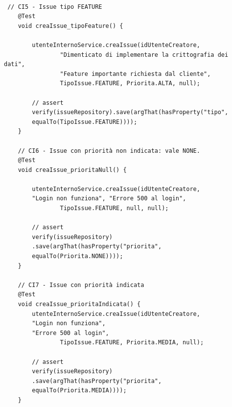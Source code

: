 \begin{listing}[!ht]
\begin{verbatim}

 // CI5 - Issue tipo FEATURE
    @Test
    void creaIssue_tipoFeature() {

        utenteInternoService.creaIssue(idUtenteCreatore, 
                "Dimenticato di implementare la crittografia dei dati",
                "Feature importante richiesta dal cliente",
                TipoIssue.FEATURE, Priorita.ALTA, null);

        // assert
        verify(issueRepository).save(argThat(hasProperty("tipo", 
        equalTo(TipoIssue.FEATURE))));
    }

    // CI6 - Issue con priorità non indicata: vale NONE.
    @Test
    void creaIssue_prioritaNull() {

        utenteInternoService.creaIssue(idUtenteCreatore, 
        "Login non funziona", "Errore 500 al login",
                TipoIssue.FEATURE, null, null);

        // assert
        verify(issueRepository)
        .save(argThat(hasProperty("priorita", 
        equalTo(Priorita.NONE))));
    }

    // CI7 - Issue con priorità indicata
    @Test
    void creaIssue_prioritaIndicata() {
        utenteInternoService.creaIssue(idUtenteCreatore, 
        "Login non funziona", 
        "Errore 500 al login",
                TipoIssue.FEATURE, Priorita.MEDIA, null);

        // assert
        verify(issueRepository)
        .save(argThat(hasProperty("priorita", 
        equalTo(Priorita.MEDIA))));
    }
   
\end{verbatim}
\end{listing}

\clearpage

